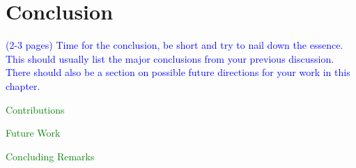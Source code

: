 \chapter{Conclusion}


\textcolor{blue}{(2-3 pages) Time for the conclusion, be short and try to nail down the essence. This should usually 
list the major conclusions from your previous discussion. There should also be a section on possible future directions 
for your work in this chapter.}

\textcolor{green}{Contributions}

\textcolor{green}{Future Work}

\textcolor{green}{Concluding Remarks}
